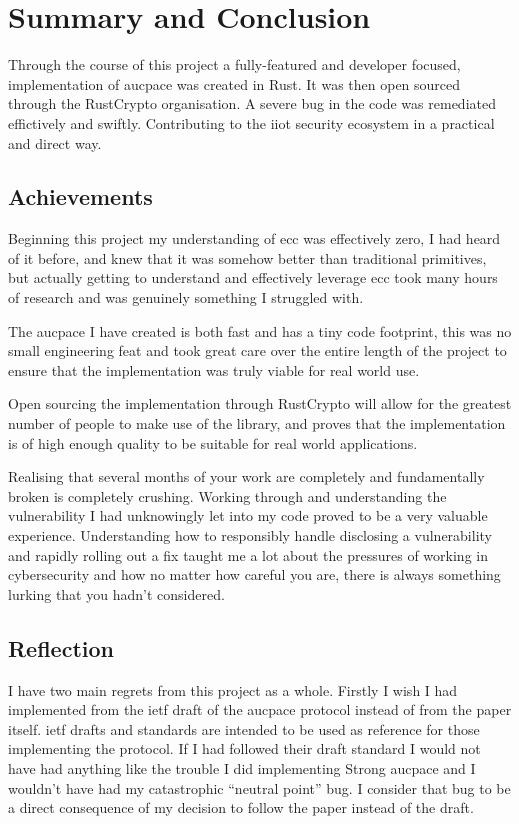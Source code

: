 \chapter{Summary and Conclusion}
\label{chap:conclusion}

Through the course of this project a fully-featured and developer focused, implementation of \gls{aucpace} was created in Rust.
It was then open sourced through the RustCrypto organisation.
A severe bug in the code was remediated effictively and swiftly.
Contributing to the \gls{iiot} security ecosystem in a practical and direct way.

\section{Achievements}
Beginning this project my understanding of \gls{ecc} was effectively zero, I had heard of it before, and knew that it was somehow better than traditional primitives, but actually getting to understand and effectively leverage \gls{ecc} took many hours of research and was genuinely something I struggled with.

The \gls{aucpace} I have created is both fast and has a tiny code footprint, this was no small engineering feat and took great care over the entire length of the project to ensure that the implementation was truly viable for real world use.

Open sourcing the implementation through RustCrypto will allow for the greatest number of people to make use of the library, and proves that the implementation is of high enough quality to be suitable for real world applications.

Realising that several months of your work are completely and fundamentally broken is completely crushing.
Working through and understanding the vulnerability I had unknowingly let into my code proved to be a very valuable experience.
Understanding how to responsibly handle disclosing a vulnerability and rapidly rolling out a fix taught me a lot about the pressures of working in cybersecurity and how no matter how careful you are, there is always something lurking that you hadn't considered.

\section{Reflection}
I have two main regrets from this project as a whole.
Firstly I wish I had implemented from the \gls{ietf} draft of the \gls{aucpace} protocol instead of from the paper itself.
\gls{ietf} drafts and standards are intended to be used as reference for those implementing the protocol.
If I had followed their draft standard I would not have had anything like the trouble I did implementing Strong \gls{aucpace} and I wouldn't have had my catastrophic \enquote{neutral point} bug.
I consider that bug to be a direct consequence of my decision to follow the paper instead of the draft.

